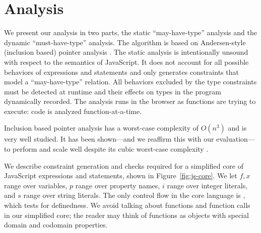 \section{Analysis}
\label{sec:analysis}

We present our analysis in two parts, the static ``may-have-type'' analysis
and the dynamic ``must-have-type'' analysis. The algorithm is based on
Andersen-style (inclusion based) pointer analysis \cite{AndersenPhD}. The
static analysis is
intentionally unsound with respect to the semantics of
JavaScript. It does not account for all possible behaviors of expressions and
statements and only generates constraints that model a ``may-have-type''
relation. All behaviors excluded by the type constraints must be detected at
runtime and their effects on types in the program dynamically recorded. The
analysis runs in the browser as functions are trying to execute: code is
analyzed function-at-a-time.

Inclusion based pointer analysis has a worst-case complexity of $O(n^3)$
and is very
well studied. It has been shown---and we reaffirm this with our evaluation---to
perform and scale well despite its cubic worst-case complexity
\cite{Sridharan09}.

%
%
%
%
%
%

We describe constraint generation and checks required for a simplified core of
JavaScript expressions and statements, shown in Figure~\ref{fig:js-core}. We
let $f,x$ range over variables, $p$ range over property names, $i$ range over
integer literals, and $s$ range over string literals. The only control flow in
the core language is , which tests for definedness. We avoid talking
about functions and function calls in our simplified core; the reader may
think of functions as objects with special domain and codomain properties.

